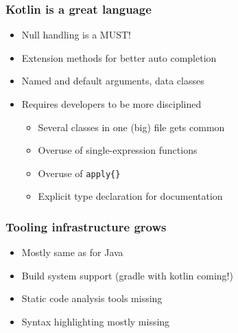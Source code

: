 


\begin{frame}
\frametitle{Kotlin is a great language}
\begin{itemize}
	\item Null handling is a MUST!
	\item Extension methods for better auto completion
	\item Named and default arguments, data classes
	\item Requires developers to be more disciplined
	\begin{itemize}
		\item Several classes in one (big) file gets common
		\item Overuse of single-expression functions
		\item Overuse of \texttt{apply\{\}}
		\item Explicit type declaration for documentation
	\end{itemize}
\end{itemize}
\end{frame}


\begin{frame}
\frametitle{Tooling infrastructure grows}
\begin{itemize}
	\item Mostly same as for Java
	\item Build system support (gradle with kotlin coming!)
	\item Static code analysis tools missing
	\item Syntax highlighting mostly missing
\end{itemize}
\end{frame}


